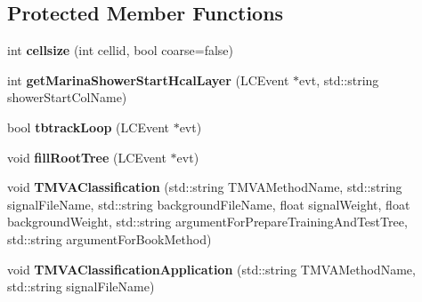 \subsection*{Protected Member Functions}
\begin{DoxyCompactItemize}
\item 
int {\bfseries cellsize} (int cellid, bool coarse=false)\label{classHcalTMVAProcessor_a22f18ae83004fa9cff45d4eb94ef978b}

\item 
int {\bfseries get\-Marina\-Shower\-Start\-Hcal\-Layer} (L\-C\-Event $\ast$evt, std\-::string shower\-Start\-Col\-Name)\label{classHcalTMVAProcessor_a12c68b7b1c5c921f12de723e41679fa7}

\item 
bool {\bfseries tbtrack\-Loop} (L\-C\-Event $\ast$evt)\label{classHcalTMVAProcessor_ad9528c31a4609b9589014de808134be8}

\item 
void {\bfseries fill\-Root\-Tree} (L\-C\-Event $\ast$evt)\label{classHcalTMVAProcessor_ab9e9661d462cfcd18e7f3d03a4225ea3}

\item 
void {\bfseries T\-M\-V\-A\-Classification} (std\-::string T\-M\-V\-A\-Method\-Name, std\-::string signal\-File\-Name, std\-::string background\-File\-Name, float signal\-Weight, float background\-Weight, std\-::string argument\-For\-Prepare\-Training\-And\-Test\-Tree, std\-::string argument\-For\-Book\-Method)\label{classHcalTMVAProcessor_ab8d2344c572a257e79a032565469849a}

\item 
void {\bfseries T\-M\-V\-A\-Classification\-Application} (std\-::string T\-M\-V\-A\-Method\-Name, std\-::string signal\-File\-Name)\label{classHcalTMVAProcessor_a90d0bc5de7db0722b39cbef51e9dacf8}

\end{DoxyCompactItemize}
